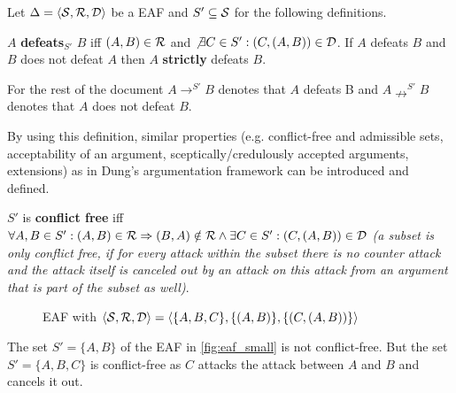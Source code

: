 Let $\Delta = \langle \S, \R, \D \rangle$ be a \gls{EAF} and $S' \subseteq \S$ for the following definitions.

\begin{definition}
$A$ \textbf{defeats$_{S'}$} $B$ iff $(A, B) \in \R$ and $\not \exists C \in S': (C, (A, B)) \in \D$. If $A$ defeats $B$ and $B$ does not defeat $A$ then $A$ \textbf{strictly} defeats $B$.
\end{definition}

\begin{notation}
For the rest of the document $A \rightarrow^{S'} B$ denotes that $A$ defeats B and $A \nrightarrow^{S'} B$ denotes that $A$ does not defeat $B$.
\end{notation}


By using this definition, similar properties (e.g. conflict-free and admissible sets, acceptability of an argument, sceptically/credulously accepted arguments, extensions) as in Dung's argumentation framework can be introduced and defined.

\begin{definition}
	$S'$ is \textbf{conflict free} iff $\forall A, B \in S': (A, B) \in \R \Rightarrow (B, A) \notin \R \wedge \exists C \in S': (C, (A, B)) \in \D$ \textit{(a subset is only conflict free, if for every attack within the subset there is no counter attack and the attack itself is canceled out by an attack on this attack from an argument that is part of the subset as well)}.
\end{definition}


\begin{figure}[h]
\centering
{}
\caption{\gls{EAF} with $\langle \S, \R, \D \rangle = \langle \{A, B, C\}, \{(A, B)\}, \{(C, (A, B))\} \rangle$}
\label{fig:eaf_small}
\end{figure}

\begin{exa}
	The set $S' = \{A, B\}$ of the \gls{EAF} in \autoref{fig:eaf_small} is not conflict-free. But the set $S' = \{A, B, C\}$ is conflict-free as $C$ attacks the attack between $A$ and $B$ and cancels it out.
\end{exa}

